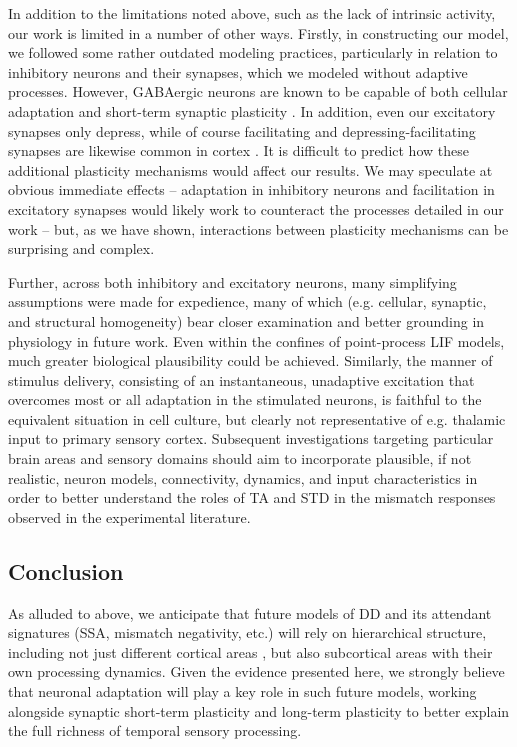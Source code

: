 \documentclass[9pt,lineno,onehalfspacing]{elife}
\begin{document}
In addition to the limitations noted above, such as the lack of intrinsic activity, our work is limited in a number of other ways.
Firstly, in constructing our model, we followed some rather outdated modeling practices, particularly in relation to inhibitory neurons and their synapses, which we modeled without adaptive processes. However, GABAergic neurons are known to be capable of both cellular adaptation and short-term synaptic plasticity \citep{Perrenoud2013-fo,Markram2004-fb,Gupta2000-jh}. In addition, even our excitatory synapses only depress, while of course facilitating and depressing-facilitating synapses are likewise common in cortex \citep{Tsodyks1997-qt,Varela1997-nr}. It is difficult to predict how these additional plasticity mechanisms would affect our results. We may speculate at obvious immediate effects -- adaptation in inhibitory neurons and facilitation in excitatory synapses would likely work to counteract the processes detailed in our work -- but, as we have shown, interactions between plasticity mechanisms can be surprising and complex.

Further, across both inhibitory and excitatory neurons, many simplifying assumptions were made for expedience, many of which (e.g. cellular, synaptic, and structural homogeneity) bear closer examination and better grounding in physiology in future work. Even within the confines of point-process LIF models, much greater biological plausibility could be achieved.
Similarly, the manner of stimulus delivery, consisting of an instantaneous, unadaptive excitation that overcomes most or all adaptation in the stimulated neurons, is faithful to the equivalent situation in cell culture, but clearly not representative of e.g. thalamic input to primary sensory cortex.
Subsequent investigations targeting particular brain areas and sensory domains should aim to incorporate plausible, if not realistic, neuron models, connectivity, dynamics, and input characteristics in order to better understand the roles of TA and STD in the mismatch responses observed in the experimental literature.

\subsection{Conclusion}

As alluded to above, we anticipate that future models of DD and its attendant signatures (SSA, mismatch negativity, etc.) will rely on hierarchical structure, including not just different cortical areas \citep{May2015-lt, Park2020-oa}, but also subcortical areas with their own processing dynamics. Given the evidence presented here, we strongly believe that neuronal adaptation will play a key role in such future models, working alongside synaptic short-term plasticity \citep{Yarden2017-eh} and long-term plasticity \citep{Hertag2020-kc} to better explain the full richness of temporal sensory processing.
\end{document}
